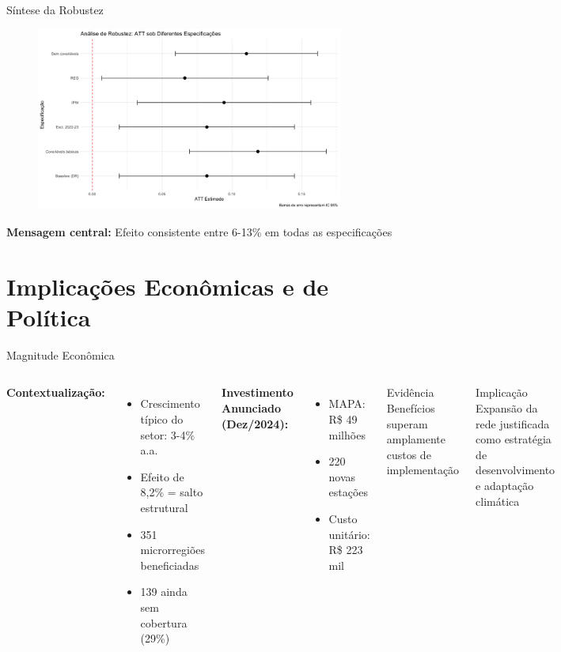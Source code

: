 \documentclass[10pt,aspectratio=169]{beamer}
\begin{document}
\begin{frame}{Síntese da Robustez}
\begin{figure}
\centering
\includegraphics[width=0.9\textwidth]{../../../data/outputs/robustness_plot.png}
\end{figure}

\textbf{Mensagem central:} Efeito consistente entre 6-13\% em todas as especificações
\end{frame}

\section{Implicações Econômicas e de Política}

\begin{frame}{Magnitude Econômica}
\begin{columns}
\textbf{Contextualização:}
\begin{itemize}
    \item Crescimento típico do setor: 3-4\% a.a.
    \item Efeito de 8,2\% = salto estrutural
    \item 351 microrregiões beneficiadas
    \item 139 ainda sem cobertura (29\%)
\end{itemize}

\vspace{0.3cm}
\textbf{Investimento Anunciado (Dez/2024):}
\begin{itemize}
    \item MAPA: R\$ 49 milhões
    \item 220 novas estações
    \item Custo unitário: R\$ 223 mil
\end{itemize}

\begin{block}{Evidência}
Benefícios superam amplamente custos de implementação
\end{block}

\vspace{0.3cm}
\begin{alertblock}{Implicação}
Expansão da rede justificada como estratégia de desenvolvimento e adaptação climática
\end{alertblock}
\end{columns}
\end{frame}
\end{document}
